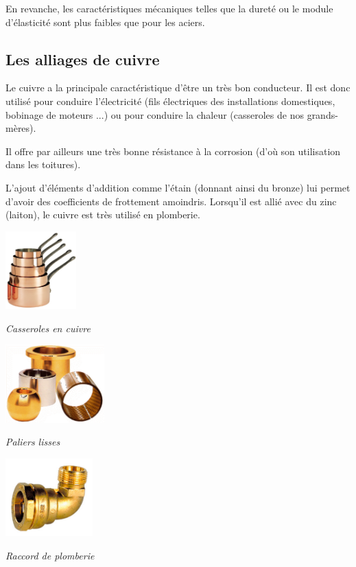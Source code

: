 \documentclass[11pt,oneside]{article}
\begin{document}
En revanche, les caractéristiques mécaniques telles que la dureté ou le module d'élasticité sont plus faibles que pour les aciers.

\subsection{Les alliages de cuivre}
Le cuivre a la principale caractéristique d'être un très bon conducteur. Il est donc utilisé pour conduire l'électricité (fils électriques des installations domestiques, bobinage de moteurs ...) ou pour conduire la chaleur (casseroles de nos grands-mères). 

Il offre par ailleurs une très bonne résistance à la corrosion (d'où son utilisation dans les toitures).

L'ajout d'éléments d'addition comme l'étain (donnant ainsi du bronze) lui permet d'avoir des coefficients de frottement amoindris. Lorsqu'il est allié avec du zinc (laiton), le cuivre est très utilisé en plomberie. 

\begin{minipage}[c]{.3\linewidth}
\begin{center}
\includegraphics[height=3cm]{png/casserole}

\textit{Casseroles en cuivre}
\end{center}
\end{minipage}\hfill
\begin{minipage}[c]{.3\linewidth}
\begin{center}
\includegraphics[height=3cm]{png/coussinets}

\textit{Paliers lisses}
\end{center}
\end{minipage}\hfill
\begin{minipage}[c]{.3\linewidth}
\begin{center}
\includegraphics[height=3cm]{png/raccord}

\textit{Raccord de plomberie}
\end{center}
\end{minipage}
\end{document}
